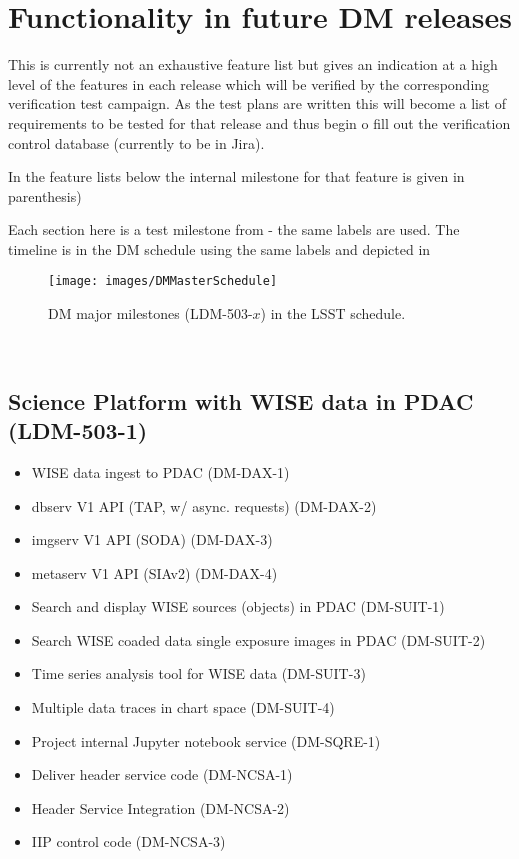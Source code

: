 \section{Functionality in future DM releases}

This is currently not an exhaustive feature list but gives an indication at a high level of the features in each release which will be verified by the corresponding verification test campaign.
As the test plans are written this will become a list of requirements to be tested for that release and thus begin o fill out the verification control database (currently to be in Jira).

In the feature lists below the internal milestone for that feature is given in parenthesis)


Each section here is a test milestone from  - the same labels are used. The timeline is in the DM schedule using the same labels and depicted in 

\begin{figure}[htbp]
        \begin{center}
                 \texttt{[image: images/DMMasterSchedule]}
                 \caption{DM major milestones (LDM-503-$x$) in the LSST schedule. \label{fig:schedule}}
         \end{center}
 \end{figure}
~

\subsection{Science Platform with WISE data in PDAC \textbf{(LDM-503-1)}\label{LDM-503-1}}


\begin{itemize}
\item WISE data ingest to PDAC (DM-DAX-1)
\item dbserv V1 API (TAP, w/ async. requests) (DM-DAX-2)
\item imgserv V1 API (SODA) (DM-DAX-3)
\item metaserv V1 API (SIAv2) (DM-DAX-4)
\item Search and display WISE sources (objects) in PDAC (DM-SUIT-1)
\item Search WISE coaded data single exposure images in PDAC (DM-SUIT-2)
\item Time series analysis tool for WISE data (DM-SUIT-3)
\item Multiple data traces in chart space (DM-SUIT-4)
\item Project internal Jupyter notebook service (DM-SQRE-1)
\item Deliver header service code (DM-NCSA-1)
\item Header Service Integration (DM-NCSA-2)
\item IIP control code (DM-NCSA-3)
\end{itemize}

